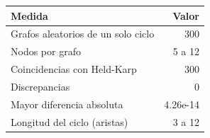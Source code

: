 \begin{tabular}{lr}
\toprule
\textbf{Medida} & \textbf{Valor} \\
\midrule
Grafos aleatorios de un solo ciclo & 300 \\
Nodos por grafo & 5 a 12 \\
Coincidencias con Held-Karp & 300 \\
Discrepancias & 0 \\
Mayor diferencia absoluta & 4.26e-14 \\
Longitud del ciclo (aristas) & 3 a 12 \\
\bottomrule
\end{tabular}
